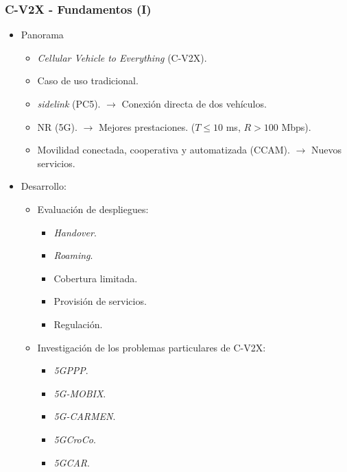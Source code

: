 \documentclass{beamer}
\begin{document}
\begin{frame}
\frametitle{C-V2X - Fundamentos (I)}

\begin{itemize}
\item {
	Panorama
	\begin{itemize}
	\item \textit{Cellular Vehicle to Everything} (C-V2X).
	\item Caso de uso tradicional.
	\item \textit{sidelink} (PC5). $\rightarrow$ Conexión directa de dos vehículos.
	\item NR (5G). $\rightarrow$ Mejores prestaciones. ($T \leq 10$ ms, $R > 100$ Mbps).
	\item Movilidad conectada, cooperativa y automatizada (CCAM). $\rightarrow$ Nuevos servicios.
	\end{itemize}
}
\item {
	Desarrollo:
	\begin{itemize}
	\item {
		Evaluación de despliegues:
		\begin{itemize}
		\item \textit{Handover}.
		\item \textit{Roaming}.
		\item Cobertura limitada.
		\item Provisión de servicios.
		\item Regulación.
		\end{itemize}
	}
	\item {
		Investigación de los problemas particulares de C-V2X:
		\begin{itemize}
		\item \textit{5GPPP}.
		\item \textit{5G-MOBIX}.
		\item \textit{5G-CARMEN}.
		\item \textit{5GCroCo}.
		\item \textit{5GCAR}.
		\end{itemize}
	}
	\end{itemize}
}
\end{itemize}
\end{frame}
\end{document}
